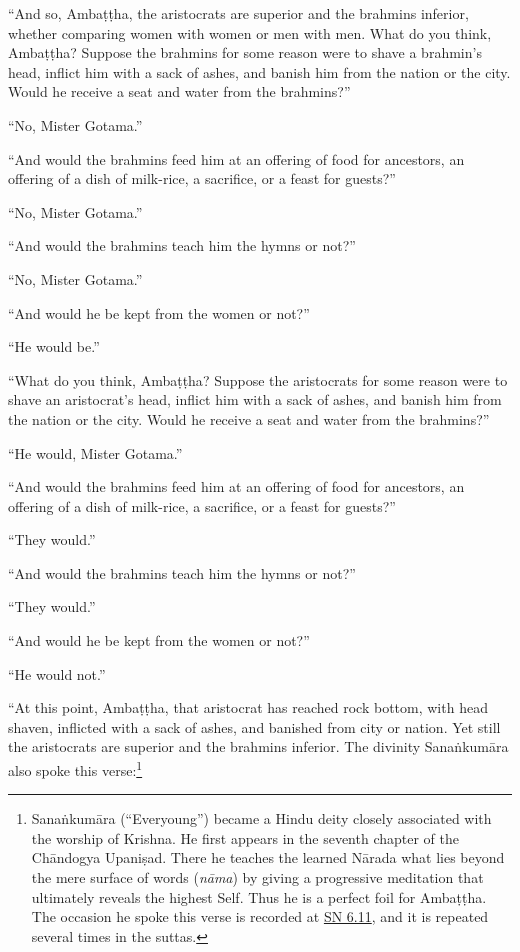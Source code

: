 \documentclass[12pt,openany]{book}%
\begin{document}
“And so, \textsanskrit{Ambaṭṭha}, the aristocrats are superior and the brahmins inferior, whether comparing women with women or men with men. What do you think, \textsanskrit{Ambaṭṭha}? Suppose the brahmins for some reason were to shave a brahmin’s head, inflict him with a sack of ashes, and banish him from the nation or the city. Would he receive a seat and water from the brahmins?” 

“No, Mister Gotama.” 

“And would the brahmins feed him at an offering of food for ancestors, an offering of a dish of milk-rice, a sacrifice, or a feast for guests?” 

“No, Mister Gotama.” 

“And would the brahmins teach him the hymns or not?” 

“No, Mister Gotama.” 

“And would he be kept from the women or not?” 

“He would be.” 

“What do you think, \textsanskrit{Ambaṭṭha}? Suppose the aristocrats for some reason were to shave an aristocrat’s head, inflict him with a sack of ashes, and banish him from the nation or the city. Would he receive a seat and water from the brahmins?” 

“He would, Mister Gotama.” 

“And would the brahmins feed him at an offering of food for ancestors, an offering of a dish of milk-rice, a sacrifice, or a feast for guests?” 

“They would.” 

“And would the brahmins teach him the hymns or not?” 

“They would.” 

“And would he be kept from the women or not?” 

“He would not.” 

“At this point, \textsanskrit{Ambaṭṭha}, that aristocrat has reached rock bottom, with head shaven, inflicted with a sack of ashes, and banished from city or nation. Yet still the aristocrats are superior and the brahmins inferior. The divinity \textsanskrit{Sanaṅkumāra} also spoke this verse:\footnote{\textsanskrit{Sanaṅkumāra} (“Everyoung”) became a Hindu deity closely associated with the worship of Krishna. He first appears in the seventh chapter of the \textsanskrit{Chāndogya} \textsanskrit{Upaniṣad}. There he teaches the learned \textsanskrit{Nārada} what lies beyond the mere surface of words (\textit{\textsanskrit{nāma}}) by giving a progressive meditation that ultimately reveals the highest Self. Thus he is a perfect foil for \textsanskrit{Ambaṭṭha}. The occasion he spoke this verse is recorded at \href{https://suttacentral.net/sn6.11/en/sujato}{SN 6.11}, and it is repeated several times in the suttas. } 
\end{document}
